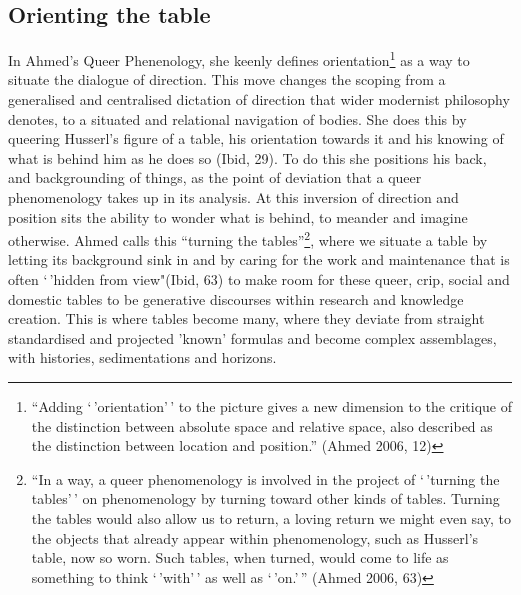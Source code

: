 \hypertarget{orienting-the-table}{%
\subsection[Orienting the
table]{\texorpdfstring{\protect\hypertarget{anchor}{}{}Orienting the
table}{Orienting the table}}\label{orienting-the-table}}

In Ahmed's Queer Phenenology, she keenly defines orientation\footnote{``Adding
  `\,'orientation'\,' to the picture gives a new dimension to the
  critique of the distinction between absolute space and relative space,
  also described as the distinction between location and position.''
  (Ahmed 2006, 12)} as a way to situate the dialogue of direction. This
move changes the scoping from a generalised and centralised dictation of
direction that wider modernist philosophy denotes, to a situated and
relational navigation of bodies. She does this by queering Husserl's
figure of a table, his orientation towards it and his knowing of what is
behind him as he does so (Ibid, 29). To do this she positions his back,
and backgrounding of things, as the point of deviation that a queer
phenomenology takes up in its analysis. At this inversion of direction
and position sits the ability to wonder what is behind, to meander and
imagine otherwise. Ahmed calls this ``turning the tables''\footnote{``In
  a way, a queer phenomenology is involved in the project of `\,'turning
  the tables'\,' on phenomenology by turning toward other kinds of
  tables. Turning the tables would also allow us to return, a loving
  return we might even say, to the objects that already appear within
  phenomenology, such as Husserl's table, now so worn. Such tables, when
  turned, would come to life as something to think `\,'with'\,' as well
  as `\,'on.'\,'' (Ahmed 2006, 63)}, where we situate a table by letting
its background sink in and by caring for the work and maintenance that
is often `\,'hidden from view"(Ibid, 63) to make room for these queer,
crip, social and domestic tables to be generative discourses within
research and knowledge creation. This is where tables become many, where
they deviate from straight standardised and projected 'known' formulas
and become complex assemblages, with histories, sedimentations and
horizons.

